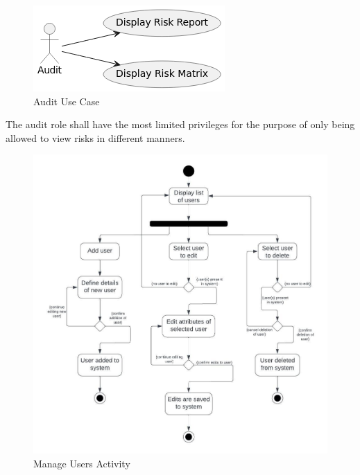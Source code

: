\documentclass[letterpaper,12pt,oneside,listof=totoc]{scrreprt}
\begin{document}
    \begin{figure} [H]
        \centering
        \includegraphics[width=0.5\linewidth]{AuditUserCase.jpg}
        \caption{Audit Use Case}
        \label{auditRole}
    \end{figure}
    
    The audit role shall have the most limited privileges for the purpose of only being allowed to view risks in different manners.
    
    \begin{figure} [H]
        \centering
        \includegraphics[width=1\linewidth]{ManageUserActivityDiagram.jpeg}
        \caption{Manage Users Activity}
        \label{manageUsers}
    \end{figure}
\end{document}
